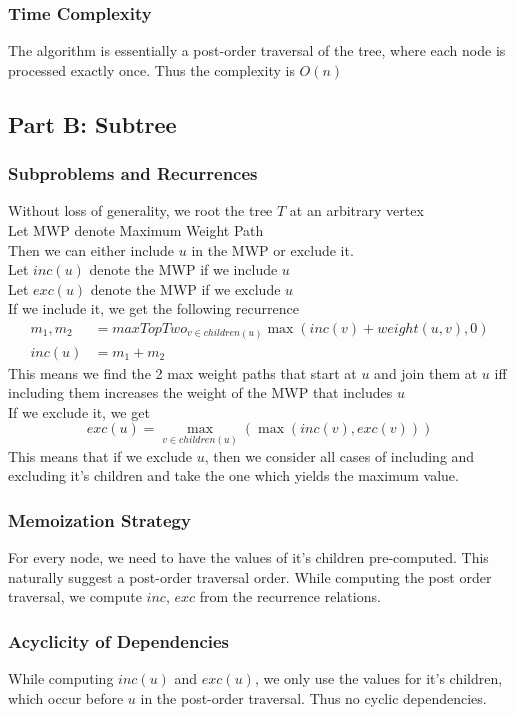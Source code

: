 \documentclass[11pt, fleqn]{article}
\begin{document}
\subsubsection*{Time Complexity}
The algorithm is essentially a post-order traversal of the tree, where each node is processed exactly once. Thus the complexity is $O(n)$ 

\subsection*{Part B: Subtree}
\subsubsection*{Subproblems and Recurrences}
Without loss of generality, we root the tree $T$ at an arbitrary vertex\\
Let MWP denote Maximum Weight Path\\
Then we can either include $u$ in the MWP or exclude it.\\
Let $inc(u)$ denote the MWP if we include $u$\\
Let $exc(u)$ denote the MWP if we exclude $u$\\
If we include it, we get the following recurrence 
$$
\begin{aligned}
     m_1, m_2 &= maxTopTwo_{v \in children(u)} \max(inc(v) + weight(u, v), 0)\\
    inc(u) &= m_1 + m_2
\end{aligned}
$$
This means we find the 2 max weight paths that start at $u$ and join them at $u$ iff including them increases the weight of the MWP that includes $u$\\
If we exclude it, we get
$$
    exc(u) = \max_{v \in children(u)}(\max(inc(v), exc(v)))
$$
This means that if we exclude $u$, then we consider all cases of including and excluding it's children and take the one which yields the maximum value.

\subsubsection*{Memoization Strategy}
For every node, we need to have the values of it's children pre-computed. This naturally suggest a post-order traversal order. While computing the post order traversal, we compute $inc$, $exc$ from the recurrence relations.

\subsubsection*{Acyclicity of Dependencies}
While computing $inc(u)$ and $exc(u)$, we only use the values for it's children, which occur before $u$ in the post-order traversal. Thus no cyclic dependencies.
\end{document}
